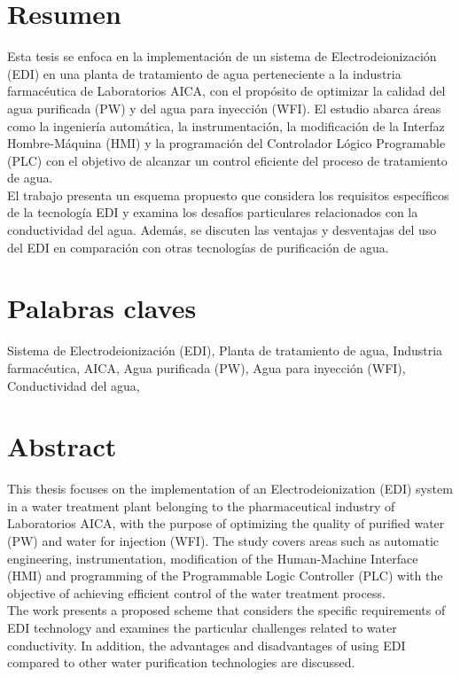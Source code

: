 \documentclass[
	spanish, %
	letterpaper, oneside
]{book}
\begin{document}
\templatePortrait

\templatePagecfg

\newcommand{\keywords}[1]{\par\noindent #1}
\newcommand{\abstracttext}[1]{\par #1}

\newpage
\section*{Resumen}
\abstracttext{Esta tesis se enfoca en la implementación de un sistema de Electrodeionización (EDI) en una planta de tratamiento de agua perteneciente a la industria farmacéutica de Laboratorios AICA, con el propósito de optimizar la calidad del agua purificada (PW) y del agua para inyección (WFI). El estudio abarca áreas como la ingeniería automática, la instrumentación, la modificación de la Interfaz Hombre-Máquina (HMI) y la programación del Controlador Lógico Programable (PLC) con el objetivo de alcanzar un control eficiente del proceso de tratamiento de agua.\\

El trabajo presenta un esquema propuesto que considera los requisitos específicos de la tecnología EDI y examina los desafíos particulares relacionados con la conductividad del agua. Además, se discuten las ventajas y desventajas del uso del EDI en comparación con otras tecnologías de purificación de agua.\\}

\section*{Palabras claves}
\keywords{Sistema de Electrodeionización (EDI), Planta de tratamiento de agua, Industria farmacéutica, AICA, Agua purificada (PW), Agua para inyección (WFI), Conductividad del agua,  }

\newpage
\section*{Abstract}
\abstracttext{This thesis focuses on the implementation of an Electrodeionization (EDI) system in a water treatment plant belonging to the pharmaceutical industry of Laboratorios AICA, with the purpose of optimizing the quality of purified water (PW) and water for injection (WFI). The study covers areas such as automatic engineering, instrumentation, modification of the Human-Machine Interface (HMI) and programming of the Programmable Logic Controller (PLC) with the objective of achieving efficient control of the water treatment process.\\
   
The work presents a proposed scheme that considers the specific requirements of EDI technology and examines the particular challenges related to water conductivity. In addition, the advantages and disadvantages of using EDI compared to other water purification technologies are discussed.\\}
\end{document}
